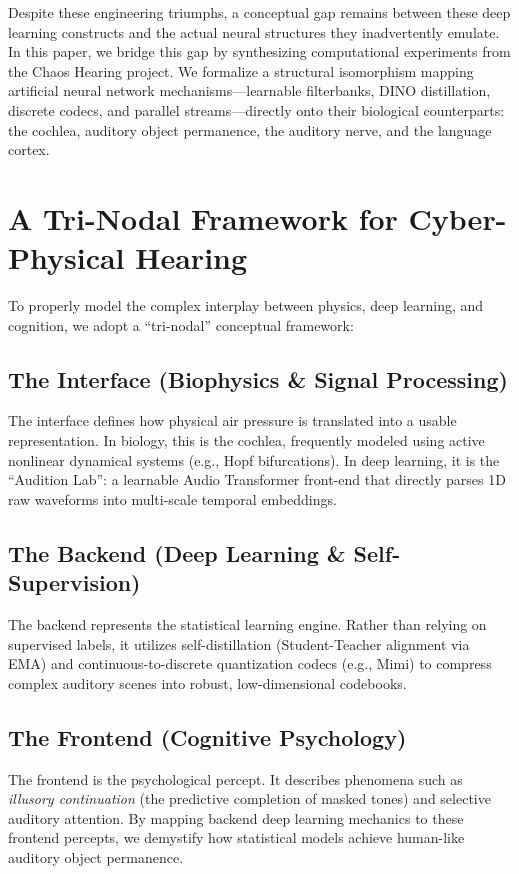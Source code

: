 \documentclass[conference]{IEEEtran}
\begin{document}
Despite these engineering triumphs, a conceptual gap remains between these deep learning constructs and the actual neural structures they inadvertently emulate. In this paper, we bridge this gap by synthesizing computational experiments from the Chaos Hearing project. We formalize a structural isomorphism mapping artificial neural network mechanisms---learnable filterbanks, DINO distillation, discrete codecs, and parallel streams---directly onto their biological counterparts: the cochlea, auditory object permanence, the auditory nerve, and the language cortex.

\section{A Tri-Nodal Framework for Cyber-Physical Hearing}

To properly model the complex interplay between physics, deep learning, and cognition, we adopt a ``tri-nodal'' conceptual framework:

\subsection{The Interface (Biophysics \& Signal Processing)}
The interface defines how physical air pressure is translated into a usable representation. In biology, this is the cochlea, frequently modeled using active nonlinear dynamical systems (e.g., Hopf bifurcations). In deep learning, it is the ``Audition Lab'': a learnable Audio Transformer front-end that directly parses 1D raw waveforms into multi-scale temporal embeddings.

\subsection{The Backend (Deep Learning \& Self-Supervision)}
The backend represents the statistical learning engine. Rather than relying on supervised labels, it utilizes self-distillation (Student-Teacher alignment via EMA) and continuous-to-discrete quantization codecs (e.g., Mimi) to compress complex auditory scenes into robust, low-dimensional codebooks.

\subsection{The Frontend (Cognitive Psychology)}
The frontend is the psychological percept. It describes phenomena such as \textit{illusory continuation} (the predictive completion of masked tones) and selective auditory attention. By mapping backend deep learning mechanics to these frontend percepts, we demystify how statistical models achieve human-like auditory object permanence.
\end{document}
